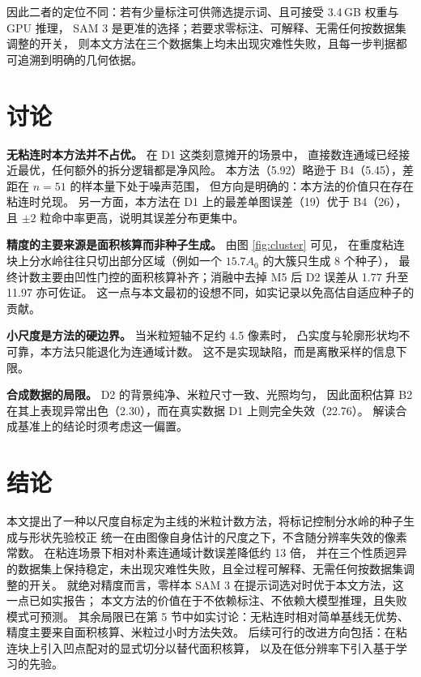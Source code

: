 \documentclass[12pt, a4paper]{ctexart}
\begin{document}
因此二者的定位不同：若有少量标注可供筛选提示词、且可接受 3.4\,GB 权重与 GPU 推理，
SAM 3 是更准的选择；若要求零标注、可解释、无需任何按数据集调整的开关，
则本文方法在三个数据集上均未出现灾难性失败，且每一步判据都可追溯到明确的几何依据。

\section{讨论}

\textbf{无粘连时本方法并不占优。} 在 D1 这类刻意摊开的场景中，
直接数连通域已经接近最优，任何额外的拆分逻辑都是净风险。
本方法（5.92）略逊于 B4（5.45），差距在 $n=51$ 的样本量下处于噪声范围，
但方向是明确的：本方法的价值只在存在粘连时兑现。
另一方面，本方法在 D1 上的最差单图误差（19）优于 B4（26），
且 $\pm2$ 粒命中率更高，说明其误差分布更集中。

\textbf{精度的主要来源是面积核算而非种子生成。} 由图 \ref{fig:cluster} 可见，
在重度粘连块上分水岭往往只切出部分区域（例如一个 $15.7A_0$ 的大簇只生成 8 个种子），
最终计数主要由凹性门控的面积核算补齐；消融中去掉 M5 后 D2 误差从 1.77 升至 11.97 亦可佐证。
这一点与本文最初的设想不同，如实记录以免高估自适应种子的贡献。

\textbf{小尺度是方法的硬边界。} 当米粒短轴不足约 4.5 像素时，
凸实度与轮廓形状均不可靠，本方法只能退化为连通域计数。
这不是实现缺陷，而是离散采样的信息下限。

\textbf{合成数据的局限。} D2 的背景纯净、米粒尺寸一致、光照均匀，
因此面积估算 B2 在其上表现异常出色（2.30），而在真实数据 D1 上则完全失效（22.76）。
解读合成基准上的结论时须考虑这一偏置。

\section{结论}

本文提出了一种以尺度自标定为主线的米粒计数方法，将标记控制分水岭的种子生成与形状先验校正
统一在由图像自身估计的尺度之下，不含随分辨率失效的像素常数。
在粘连场景下相对朴素连通域计数误差降低约 13 倍，
并在三个性质迥异的数据集上保持稳定，未出现灾难性失败，且全过程可解释、无需任何按数据集调整的开关。
就绝对精度而言，零样本 SAM 3 在提示词选对时优于本文方法，这一点已如实报告；
本文方法的价值在于不依赖标注、不依赖大模型推理，且失败模式可预测。
其余局限已在第 5 节中如实讨论：无粘连时相对简单基线无优势、
精度主要来自面积核算、米粒过小时方法失效。
后续可行的改进方向包括：在粘连块上引入凹点配对的显式切分以替代面积核算，
以及在低分辨率下引入基于学习的先验。
\end{document}
